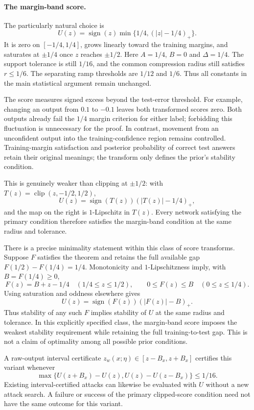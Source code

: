 \paragraph{The margin-band score.}
The particularly natural choice is
\begin{equation}\label{eq:margin-band-score}
 U(z)=\operatorname{sign}(z)
          \min\{1/4,(|z|-1/4)_+\}.
\end{equation}
It is zero on $[-1/4,1/4]$, grows linearly toward the training margins,
and saturates at $\pm1/4$ once $z$ reaches $\pm1/2$.
Here $A=1/4$, $B=0$ and $\Delta=1/4$. The support tolerance is
still $1/16$, and the common compression radius still satisfies
$r\le1/6$. The separating ramp thresholds are $1/12$ and $1/6$.
Thus all constants in the main statistical argument remain unchanged.

The score measures signed excess beyond the test-error threshold.
For example, changing an output from $0.1$ to $-0.1$ leaves both
transformed scores zero. Both outputs already fail the $1/4$ margin
criterion for either label; forbidding this
fluctuation is unnecessary for the proof. In contrast, movement from
an unconfident output into the training-confidence region remains
controlled. Training-margin satisfaction and posterior probability of
correct test answers retain their original meanings; the transform
only defines the prior's stability condition.

This is genuinely weaker than clipping at $\pm1/2$: with
$T(z)=\operatorname{clip}(z,-1/2,1/2)$,
\[
 U(z)=\operatorname{sign}(T(z))(|T(z)|-1/4)_+,
\]
and the map on the right is $1$-Lipschitz in $T(z)$.
Every network satisfying the primary condition therefore satisfies the
margin-band condition at the same radius and tolerance.

There is a precise minimality statement within this class of score
transforms. Suppose $F$ satisfies the theorem and retains the full
available gap $F(1/2)-F(1/4)=1/4$. Monotonicity and
$1$-Lipschitzness imply, with $B=F(1/4)\ge0$,
\[
 F(z)=B+z-1/4\quad(1/4\le z\le1/2),\qquad
 0\le F(z)\le B\quad(0\le z\le1/4).
\]
Using saturation and oddness elsewhere gives
\[
 U(z)=\operatorname{sign}(F(z))(|F(z)|-B)_+.
\]
Thus stability of any such $F$ implies stability of $U$ at the same
radius and tolerance. In this explicitly specified class, the
margin-band score imposes the weakest stability requirement while
retaining the full training-to-test gap. This is not a claim of
optimality among all possible prior conditions.

A raw-output interval certificate $z_w(x;\eta)\in[z-B_x,z+B_x]$
certifies this variant whenever
\[
 \max\{U(z+B_x)-U(z),U(z)-U(z-B_x)\}\le1/16.
\]
Existing interval-certified attacks can likewise be evaluated with
$U$ without a new attack search. A failure or success of the primary
clipped-score condition need not have the same outcome for this variant.
